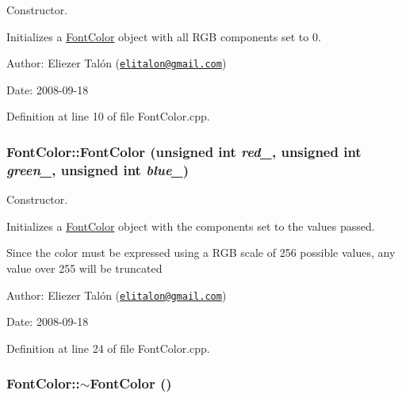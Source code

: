 Constructor. 

Initializes a \hyperlink{struct_font_color}{FontColor} object with all RGB components set to 0.

\begin{Desc}
\item[Author:]Eliezer Talón (\href{mailto:elitalon@gmail.com}{\tt elitalon@gmail.com}) \end{Desc}
\begin{Desc}
\item[Date:]2008-09-18 \end{Desc}


Definition at line 10 of file FontColor.cpp.\hypertarget{struct_font_color_7ed65a063287bfa5ba792bd4d85c1b51}{
\subsubsection[FontColor]{\setlength{\rightskip}{0pt plus 5cm}FontColor::FontColor (unsigned int {\em red\_\-}, \/  unsigned int {\em green\_\-}, \/  unsigned int {\em blue\_\-})}}
\label{struct_font_color_7ed65a063287bfa5ba792bd4d85c1b51}


Constructor. 

Initializes a \hyperlink{struct_font_color}{FontColor} object with the components set to the values passed.

Since the color must be expressed using a RGB scale of 256 possible values, any value over 255 will be truncated

\begin{Desc}
\item[Author:]Eliezer Talón (\href{mailto:elitalon@gmail.com}{\tt elitalon@gmail.com}) \end{Desc}
\begin{Desc}
\item[Date:]2008-09-18 \end{Desc}


Definition at line 24 of file FontColor.cpp.\hypertarget{struct_font_color_660917a7d04fdf47910573165f67cdaa}{
\subsubsection[$\sim$FontColor]{\setlength{\rightskip}{0pt plus 5cm}FontColor::$\sim$FontColor ()}}
\label{struct_font_color_660917a7d04fdf47910573165f67cdaa}


